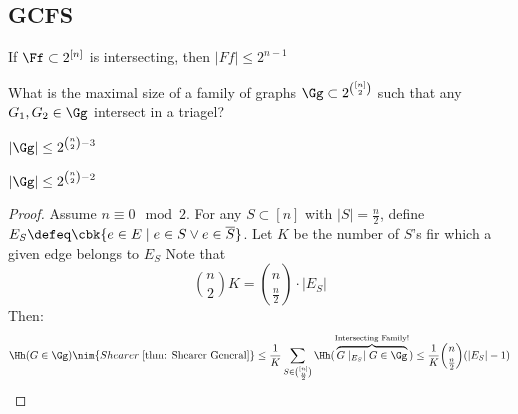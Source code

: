 \documentclass[a4paper, 11pt, oneside]{book}
\begin{document}
	\subsection{GCFS}
	\begin{thm}
		 If $\Ff\subset 2^{[n]}$ is intersecting, then $|Ff|\le 2^{n-1}$
	\end{thm}
	\begin{quest}
		What is the maximal size of a family of graphs $\Gg\subset 2^{[n]\choose 2}$ such that any $G_1,G_2\in \Gg$ intersect in a triagel?
	\end{quest}
	\begin{thm}
		 $|\Gg|\le 2^{{n\choose 2}-3}$
	\end{thm}
	\begin{thm}
		$|\Gg|\le 2^{{n\choose 2}-2}$
	\end{thm}
	\begin{proof}
		Assume $n \equiv 0\mod 2$. For any $S\subset [n]$ with $|S| = \frac{n}{2}$, define $E_S \defeq \cbk{e\in E\mid e\in S \vee e\in \overline{S}}$. Let $K$ be the number of $S$'s fir which a given edge belongs to $E_S$ Note that 
		\[
		{n\choose 2}K = {n\choose \frac{n}{2}}\cdot |E_S|
		\]
		Then:
		\begin{align*}
			\Hh(G\in \Gg)\nim{Shearer\; \ref{thm: Shearer General}} \le \frac{1}{K}\sum_{S\in {[n]\choose \frac{n}{2}}} \Hh(\overbrace{G\mid_{E_S} \mid G\in \Gg}^\text{Intersecting Family!})\le \frac{1}{K}{n\choose \frac{n}{2}}(|E_S|-1)
		\end{align*}
	\end{proof}
\end{document}
